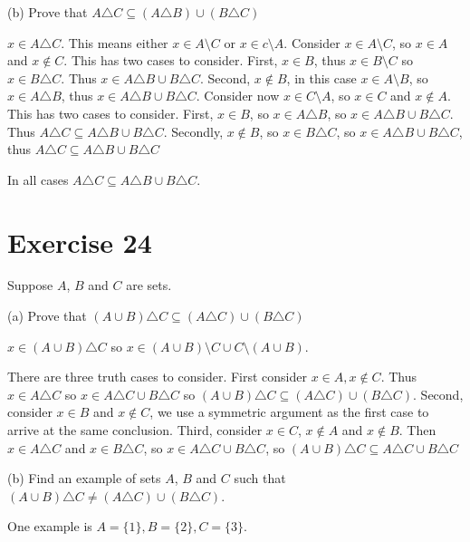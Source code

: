 \documentclass[11pt]{article}
\begin{document}
\noindent (b) Prove that $A \triangle C \subseteq (A \triangle B) \cup (B \triangle C)$

$x \in A \triangle C$. This means either $x \in A \setminus C$ or $x \in c \setminus A$.
Consider $x \in A \setminus C$, so $x \in A$ and $x \notin C$. This has two cases to consider.
First, $x \in B$, thus $x \in B \setminus C$ so $x \in B \triangle C$. Thus 
$x \in A \triangle B \cup B \triangle C$. Second, $x \notin B$, in this case 
$x \in A \setminus B$, so $x \in A \triangle B$, thus $x \in A \triangle B \cup B \triangle C$.
Consider now $x \in C \setminus A$, so $x \in C$ and $x \notin A$. This has 
two cases to consider. First, $x \in B$, so $x \in A \triangle B$, so 
$x \in A \triangle B \cup B \triangle C$. 
Thus $A \triangle C \subseteq A \triangle B \cup B \triangle C$. Secondly, 
$x \notin B$, so $x \in B \triangle C$, so 
$x \in A \triangle B \cup B \triangle C$, thus 
$A \triangle C \subseteq A \triangle B \cup B \triangle C$

In all cases $A \triangle C \subseteq A \triangle B \cup B \triangle C$.

\section*{Exercise 24}

Suppose $A$, $B$ and $C$ are sets.

\noindent (a) Prove that $(A \cup B) \triangle C \subseteq (A \triangle C) \cup (B \triangle C)$

$x \in (A \cup B) \triangle C$ so 
$x \in (A \cup B) \setminus C \cup C \setminus (A \cup B)$.

There are three truth cases to consider. First consider $x \in A, x \notin C$.
Thus $x \in A \triangle C$ so $x \in A \triangle C \cup B \triangle C$ so 
$(A \cup B) \triangle C \subseteq (A \triangle C) \cup (B \triangle C)$. Second,
consider $x \in B$ and $x \notin C$, we use a symmetric argument as the first case
to arrive at the same conclusion.
Third, consider $x \in C$, $x \notin A$ and $x \notin B$. 
Then $x \in A \triangle C$ and $x \in B \triangle C$, so 
$x \in A \triangle C \cup B \triangle C$, so 
$(A \cup B) \triangle C \subseteq A \triangle C \cup B \triangle C$

\noindent (b) Find an example of sets $A$, $B$ and $C$ such that 
$(A \cup B) \triangle C \neq (A \triangle C) \cup (B \triangle C)$.

One example is $A = \{1\}, B = \{2\}, C = \{3\}$.
\end{document}
